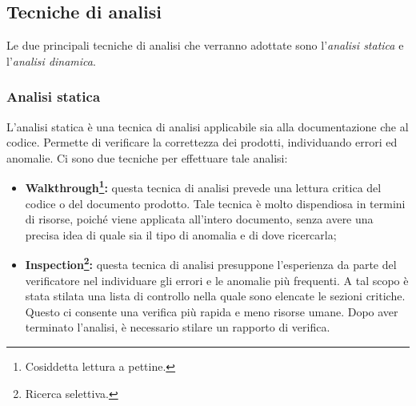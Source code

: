 \subsection{Tecniche di analisi}
Le due principali tecniche di analisi che verranno adottate sono l'\textit{analisi statica} e l'\textit{analisi dinamica}.
	\subsubsection{Analisi statica}
	L'analisi statica è una tecnica di analisi applicabile sia alla documentazione che al codice. Permette di verificare la correttezza dei prodotti, individuando errori ed anomalie. Ci sono due tecniche per effettuare tale analisi:
	\begin{itemize}
		\item \textbf{\gls{Walkthrough}\footnote{Cosiddetta lettura a pettine.}:} questa tecnica di analisi prevede una lettura critica del codice o del documento prodotto. Tale tecnica è molto dispendiosa in termini di risorse, poiché viene applicata all'intero documento, senza avere una precisa idea di quale sia il tipo di anomalia e di dove ricercarla;
		\item \textbf{\gls{Inspection}\footnote{Ricerca selettiva.}:} questa tecnica di analisi presuppone l'esperienza da parte del verificatore nel individuare gli errori e le anomalie più frequenti. A tal scopo è stata stilata una lista di controllo nella quale sono elencate le sezioni critiche. Questo ci consente una verifica più rapida e meno risorse umane. Dopo aver terminato l'analisi, è necessario stilare un rapporto di verifica.
	\end{itemize}
	
